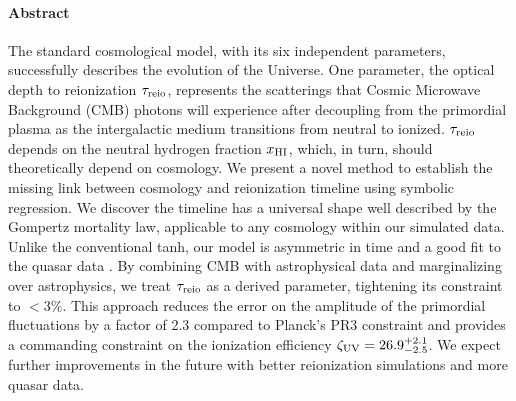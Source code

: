 \paragraph{\large Abstract}  %
The standard cosmological model, with its six independent parameters,
successfully describes the evolution of the Universe.
One parameter, the optical depth to reionization $\tau_{\mathrm{reio}}$,
represents the scatterings that Cosmic Microwave Background (CMB)
photons will experience after decoupling from the primordial plasma as
the intergalactic medium transitions from neutral to ionized.
$\tau_{\mathrm{reio}}$ depends on the neutral hydrogen fraction $x_{\mathrm{HI}}$, which, in
turn, should theoretically depend on cosmology.
We present a novel method to establish the missing link between
cosmology and reionization timeline using symbolic regression.
We discover the timeline has a universal shape well described by the
Gompertz mortality law, applicable to any cosmology within our simulated
data.
Unlike the conventional tanh, our model is asymmetric in time and a good
fit to the quasar data .
By combining CMB with astrophysical data and marginalizing over
astrophysics, we treat $\tau_{\mathrm{reio}}$ as a derived parameter, tightening
its constraint to $<3\%$.
This approach reduces the error on the amplitude of the primordial
fluctuations by a factor of 2.3 compared to Planck's PR3 constraint and
provides a commanding constraint on the ionization efficiency $\zeta_\mathrm{UV} =
26.9^{+2.1}_{-2.5}$.
We expect further improvements in the future with better reionization
simulations and more quasar data. 
